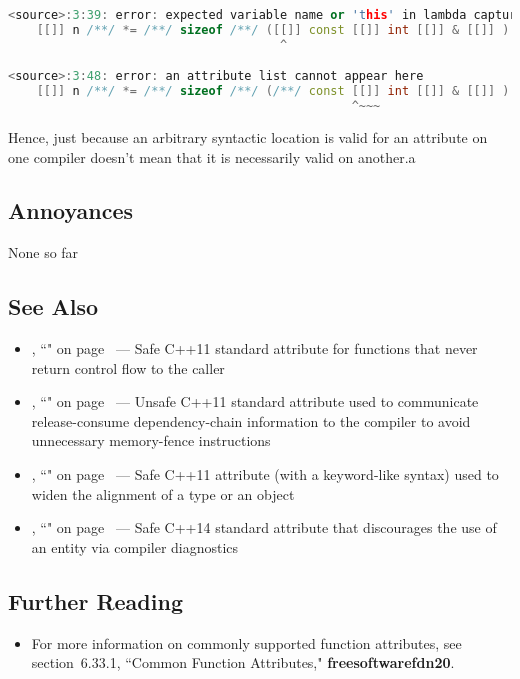 \begin{lstlisting}[language=C++]
<source>:3:39: error: expected variable name or 'this' in lambda capture list
    [[]] n /**/ *= /**/ sizeof /**/ ([[]] const [[]] int [[]] & [[]] ) /**/;
                                      ^

<source>:3:48: error: an attribute list cannot appear here
    [[]] n /**/ *= /**/ sizeof /**/ (/**/ const [[]] int [[]] & [[]] ) /**/;
                                                ^~~~
\end{lstlisting}

\noindent Hence, just because an arbitrary syntactic location is valid for an
attribute on one compiler doesn't mean that it is necessarily valid on
another.a

\subsection[Annoyances]{Annoyances}\label{annoyances}

None so far

\subsection[See Also]{See Also}\label{see-also}

\begin{itemize}
\item{\locationa, ``" on page~\pageref{the-noreturn-attribute} — Safe C++11 standard attribute for functions that never return control flow to the caller}
\item{\locatione, ``" on page~\pageref{carriesdependency} — Unsafe C++11 standard attribute used to communicate release-consume dependency-chain information to the compiler to avoid unnecessary memory-fence instructions}
\item{\locationa, ``" on page~\pageref{alignas} --- Safe C++11 attribute (with a keyword-like syntax) used to widen the alignment of a type or an object}
\item{\locationb, ``" on page~\pageref{deprecated} — Safe C++14 standard attribute that discourages the use of an entity via compiler diagnostics}
\end{itemize}

\subsection[Further Reading]{Further Reading}\label{attribute-further-reading}
\begin{itemize}
\item{For more information on commonly supported function attributes, see
section~6.33.1, ``Common Function Attributes," \textbf{{freesoftwarefdn20}}.}
\end{itemize}

